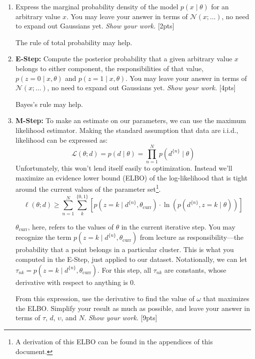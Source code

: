 \begin{enumerate}[label=\alph*.]
    \item Express the marginal probability density of the model $p(x\mid\theta)$ for an arbitrary value $x$. You may leave your answer in terms of $\mathcal{N}(x; \dots)$, no need to expand out Gaussians yet. \emph{Show your work.} [2pts]
    \begin{hintbox}
        The rule of total probability may help. %
    \end{hintbox}

    \item \textbf{E-Step:} Compute the posterior probability that a given arbitrary value $x$ belongs to either component, the responsibilities of that value, $p(z=0\mid x,\theta)$ and $p(z=1\mid x,\theta)$. You may leave your answer in terms of $\mathcal{N}(x; \dots)$, no need to expand out Gaussians yet. \emph{Show your work.} [4pts]
    \begin{hintbox}
        Bayes's rule may help. %
    \end{hintbox}

    \item \textbf{M-Step:} To make an estimate on our parameters, we can use the maximum likelihood estimator. Making the standard assumption that data are i.i.d., likelihood can be expressed as:
    $$\mathcal{L}(\theta; d) = p(d\mid \theta) = \prod_{n=1}^N p(d^{\{n\}} \mid\theta)$$
    Unfortunately, this won't lend itself easily to optimization. Instead we'll maximize an evidence lower bound (ELBO) of the log-likelihood that is tight around the current values of the parameter set\footnote{A derivation of this ELBO can be found in the appendices of this document.}.
    $$\ell(\theta; d) \geq \sum_{n=1}^N \sum_k^{\{0,1\}} \left[ p(z=k\mid d^{\{n\}}, \theta_{\text{curr}})\cdot \ln\left(p(d^{\{n\}}, z=k \mid \theta)\right) \right]$$
    \begin{hintbox}
        $\theta_{\text{curr}}$, here, refers to the values of $\theta$ in the current iterative step. You may recognize the term $p(z=k\mid d^{\{n\}}, \theta_{\text{curr}})$ from lecture as responsibility—the probability that a point belongs in a particular cluster. This is what you computed in the E-Step, just applied to our dataset. Notationally, we can let $\tau_{nk} = p(z=k\mid d^{\{n\}}, \theta_{\text{curr}})$. For this step, all $\tau_{nk}$ are constants, whose derivative with respect to anything is 0.
    \end{hintbox}

    From this expression, use the derivative to find the value of $\omega$ that maximizes the ELBO. Simplify your result as much as possible, and leave your answer in terms of $\tau$, $d$, $\upsilon$, and $N$. \emph{Show your work.} [9pts]
\end{enumerate}
\newpage




